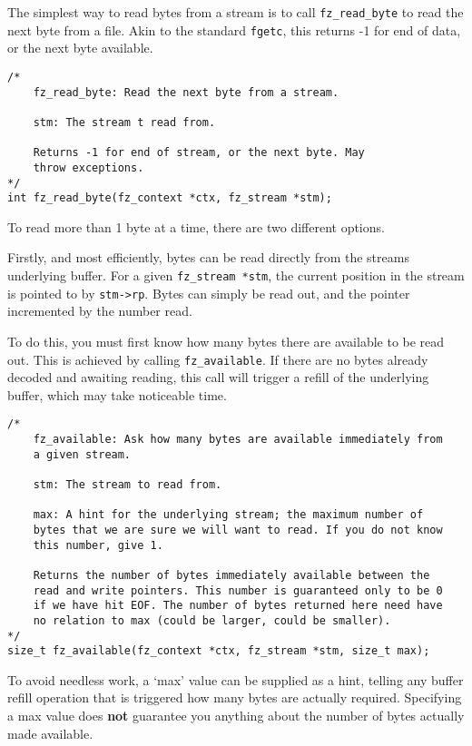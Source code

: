 \documentclass[oneside]{book}
\begin{document}
The simplest way to read bytes from a stream is to call \texttt{fz\_read\_byte} to read the next byte from a file. Akin to the standard \texttt{fgetc}, this returns -1 for end of data, or the next byte available.

\begin{lstlisting}
/*
	fz_read_byte: Read the next byte from a stream.
	
	stm: The stream t read from.
	
	Returns -1 for end of stream, or the next byte. May
	throw exceptions.
*/
int fz_read_byte(fz_context *ctx, fz_stream *stm);
\end{lstlisting}

To read more than 1 byte at a time, there are two different options.

Firstly, and most efficiently, bytes can be read directly from the streams underlying buffer. For a given \texttt{fz\_stream *stm}, the current position in the stream is pointed to by \texttt{stm->rp}. Bytes can simply be read out, and the pointer incremented by the number read.

To do this, you must first know how many bytes there are available to be read out. This is achieved by calling \texttt{fz\_available}. If there are no bytes already decoded and awaiting reading, this call will trigger a refill of the underlying buffer, which may take noticeable time.

\begin{lstlisting}
/*
	fz_available: Ask how many bytes are available immediately from
	a given stream.

	stm: The stream to read from.

	max: A hint for the underlying stream; the maximum number of
	bytes that we are sure we will want to read. If you do not know
	this number, give 1.

	Returns the number of bytes immediately available between the
	read and write pointers. This number is guaranteed only to be 0
	if we have hit EOF. The number of bytes returned here need have
	no relation to max (could be larger, could be smaller).
*/
size_t fz_available(fz_context *ctx, fz_stream *stm, size_t max);
\end{lstlisting}

To avoid needless work, a `max' value can be supplied as a hint, telling any buffer refill operation that is triggered how many bytes are actually required. Specifying a max value does \textbf{not} guarantee you anything about the number of bytes actually made available.
\end{document}
